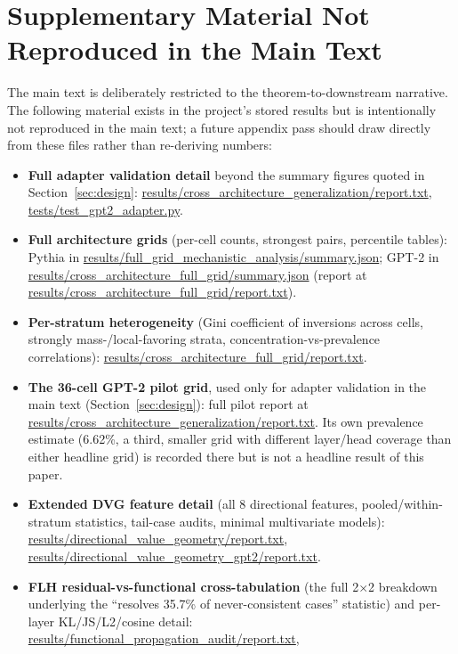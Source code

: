 \documentclass[11pt]{article}
\begin{document}
\section{Supplementary Material Not Reproduced in the Main Text}
\label{app:supplement}

The main text is deliberately restricted to the theorem-to-downstream
narrative. The following material exists in the project's stored results
but is intentionally not reproduced in the main text; a future appendix
pass should draw directly from these files rather than re-deriving numbers:

\begin{small}
\begin{itemize}[nosep]
\item \textbf{Full adapter validation detail} beyond the summary figures
quoted in Section~\ref{sec:design}: \url{results/cross_architecture_generalization/report.txt},
\url{tests/test_gpt2_adapter.py}.
\item \textbf{Full architecture grids} (per-cell counts, strongest pairs,
percentile tables): Pythia in
\url{results/full_grid_mechanistic_analysis/summary.json}; GPT-2 in
\url{results/cross_architecture_full_grid/summary.json} (report at
\url{results/cross_architecture_full_grid/report.txt}).
\item \textbf{Per-stratum heterogeneity} (Gini coefficient of inversions
across cells, strongly mass-/local-favoring strata, concentration-vs-prevalence
correlations): \url{results/cross_architecture_full_grid/report.txt}.
\item \textbf{The 36-cell GPT-2 pilot grid}, used only for adapter
validation in the main text (Section~\ref{sec:design}): full pilot report at
\url{results/cross_architecture_generalization/report.txt}. Its own
prevalence estimate (6.62\%, a third, smaller grid with different
layer/head coverage than either headline grid) is recorded there but is not
a headline result of this paper.
\item \textbf{Extended DVG feature detail} (all 8 directional features,
pooled/within-stratum statistics, tail-case audits, minimal multivariate
models): \url{results/directional_value_geometry/report.txt},
\url{results/directional_value_geometry_gpt2/report.txt}.
\item \textbf{FLH residual-vs-functional cross-tabulation} (the full
2$\times$2 breakdown underlying the ``resolves 35.7\% of never-consistent
cases'' statistic) and per-layer KL/JS/L2/cosine detail:
\url{results/functional_propagation_audit/report.txt},

\end{itemize}
\end{small}
\end{document}
